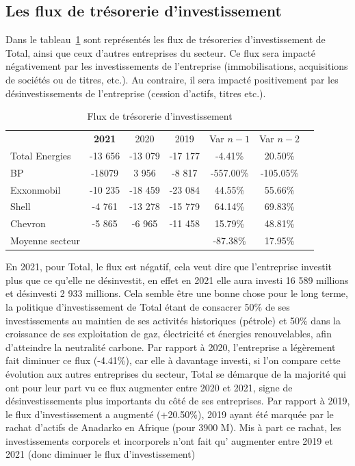 \documentclass[12pt]{article}
\begin{document}
\subsection{Les flux de trésorerie d'investissement}
Dans le tableau~\ref{table:fluxInvest} sont représentés les flux de trésoreries d'investissement de Total, ainsi que ceux d'autres entreprises du secteur. Ce flux sera impacté négativement par les  investissements de l'entreprise (immobilisations, acquisitions de sociétés ou de titres, etc.). Au contraire, il sera impacté positivement par les désinvestissements de l'entreprise (cession d'actifs, titres etc.).
\begin{table}[H]
    \centering
    \sffamily
    \caption{Flux de trésorerie d'investissement}
    \label{table:fluxInvest}
    \begin{tabular}{l*{1}{cccccc}}
    \toprule
        ~ & \textbf{2021} & 2020 & 2019 & Var $n-1$ & Var $n-2$ \\ 
        \cmidrule(r){1-1}\cmidrule(r){2-4}\cmidrule(r){5-6}
        Total Energies & -13 656 & -13 079 & -17 177 & -4.41\% & 20.50\% \\
        \cmidrule(r){1-1}\cmidrule(r){2-4}\cmidrule(r){5-6}
        BP & -18079 & 3 956 & -8 817 & -557.00\% & -105.05\% \\ 
        Exxonmobil & -10 235 & -18 459 & -23 084 & 44.55\% & 55.66\% \\ 
        Shell & -4 761 & -13 278 & -15 779 & 64.14\% & 69.83\% \\ 
        Chevron & -5 865 & -6 965 & -11 458 & 15.79\% & 48.81\% \\
        \cmidrule(r){1-1}\cmidrule(r){2-4}\cmidrule(r){5-6}
        Moyenne secteur & ~ & ~ & ~ & -87.38\% & 17.95\% \\
    \bottomrule
    \end{tabular}
\end{table}
En 2021, pour Total, le flux est négatif, cela veut dire que l'entreprise investit plus que ce qu'elle ne désinvestit, en effet en 2021 elle aura investi 16 589 millions et désinvesti 2 933 millions. Cela semble être une bonne chose pour le long terme, la politique d'investissement de Total étant de consacrer 50\% de ses investissements au maintien de ses activités historiques (pétrole) et 50\% dans la croissance de ses exploitation de gaz, électricité et énergies renouvelables, afin d'atteindre la neutralité carbone.
Par rapport à 2020, l'entreprise a légèrement fait diminuer ce flux (-4.41\%), car elle à davantage investi, si l'on compare cette évolution aux autres entreprises du secteur, Total se démarque de la majorité qui ont pour leur part vu ce flux augmenter entre 2020 et 2021, signe de désinvestissements plus importants du côté de ses entreprises.
Par rapport à 2019, le flux d'investissement a augmenté (+20.50\%), 2019 ayant été marquée par le rachat d'actifs de Anadarko en Afrique (pour 3900 M). Mis à part ce rachat, les investissements corporels et incorporels n'ont fait qu' augmenter entre 2019 et 2021 (donc diminuer le flux d'investissement)
\end{document}
